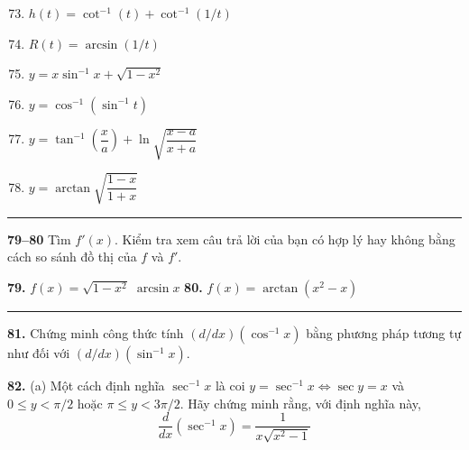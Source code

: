 \noindent
\begin{minipage}[t]{0.475\textwidth}
    \begin{enumerate}[label=\textbf{\arabic*.}, leftmargin=*, itemsep=2.5pt, topsep=0pt]
        \setcounter{enumi}{72}
        \item $h(t) = \cot^{-1}(t) + \cot^{-1}(1/t)$
        \item $R(t) = \arcsin(1/t)$
        \item $y = x\sin^{-1}x + \sqrt{1 - x^2}$
        \item $y = \cos^{-1}(\sin^{-1}t)$
        \item $y = \tan^{-1}\!\left(\dfrac{x}{a}\right) + \ln\sqrt{\dfrac{x - a}{x + a}}$
        \item $y = \arctan\sqrt{\dfrac{1 - x}{1 + x}}$
    \end{enumerate}

    \vspace{2pt}
    {\color{stewartcyan}\rule{\linewidth}{0.6pt}}
    \vspace{1pt}

    \noindent
    \hspace{4pt}%
    \textbf{\color{stewartcyan}79--80}\; \small Tìm $f'(x)$. Kiểm tra xem câu trả lời của bạn có hợp lý hay không bằng cách so sánh đồ thị của $f$ và $f'$.
    
    \vspace{3pt}
    \noindent
    \textbf{79.}\; $f(x) = \sqrt{1 - x^2}\;\arcsin x$\hfill
    \textbf{80.}\; $f(x) = \arctan(x^2 - x)$

    \vspace{1pt}
    {\color{stewartcyan}\rule{\linewidth}{0.6pt}}
    \vspace{3pt}

    \noindent
    \textbf{81.}\; Chứng minh công thức tính $(d/dx)(\cos^{-1}x)$ bằng phương pháp tương tự như đối với $(d/dx)(\sin^{-1}x)$.

    \vspace{4pt}
    \noindent
    \textbf{82.}\; (a) Một cách định nghĩa $\sec^{-1}x$ là coi $y = \sec^{-1}x \iff \sec y = x$ và $0 \le y < \pi/2$ hoặc $\pi \le y < 3\pi/2$. Hãy chứng minh rằng, với định nghĩa này,
    \[
    \frac{d}{dx}(\sec^{-1}x) = \frac{1}{x\sqrt{x^2 - 1}}
    \]
\end{minipage}%
